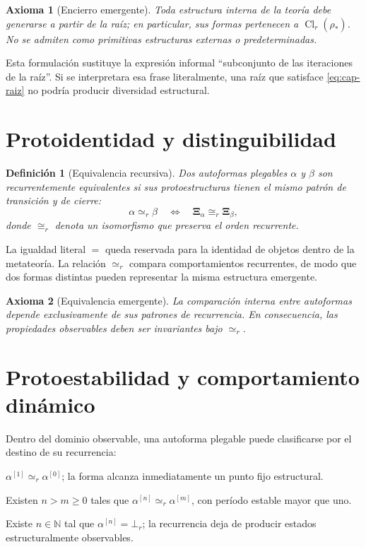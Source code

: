 \documentclass[11pt]{article}
\numberwithin{equation}{section}
\theoremstyle{prism}
\newtheorem{axiomacap}{Axioma}
\newtheorem{defcap}{Definición}
\newcommand{\N}{\mathbb{N}}
\newcommand{\raiz}{\rho_{\!*}}
\newcommand{\iter}[2]{#1^{[#2]}}
\newcommand{\peq}{\simeq_{\!r}}
\newcommand{\inestable}{\bot_{\!r}}
\newcommand{\Proto}[1]{\boldsymbol{\Xi}_{#1}}
\DeclareMathOperator{\Cl}{Cl}
\begin{document}
\begin{axiomacap}[Encierro emergente]
Toda estructura interna de la teoría debe generarse a partir de la raíz; en
particular, sus formas pertenecen a $\Cl_r(\raiz)$. No se admiten como primitivas
estructuras externas o predeterminadas.
\end{axiomacap}

Esta formulación sustituye la expresión informal ``subconjunto de las iteraciones
de la raíz''. Si se interpretara esa frase literalmente, una raíz que satisface
\eqref{eq:cap-raiz} no podría producir diversidad estructural.

\section{Protoidentidad y distinguibilidad}

\begin{defcap}[Equivalencia recursiva]
Dos autoformas plegables $\alpha$ y $\beta$ son recurrentemente equivalentes si
sus protoestructuras tienen el mismo patrón de transición y de cierre:
\begin{equation}
  \alpha\peq\beta
  \quad\Longleftrightarrow\quad
  \Proto{\alpha}\cong_r\Proto{\beta},
  \label{eq:igualdad-recursiva}
\end{equation}
donde $\cong_r$ denota un isomorfismo que preserva el orden recurrente.
\end{defcap}

La igualdad literal $=$ queda reservada para la identidad de objetos dentro de
la metateoría. La relación $\peq$ compara comportamientos recurrentes, de modo
que dos formas distintas pueden representar la misma estructura emergente.

\begin{axiomacap}[Equivalencia emergente]
La comparación interna entre autoformas depende exclusivamente de sus patrones
de recurrencia. En consecuencia, las propiedades observables deben ser
invariantes bajo $\peq$.
\end{axiomacap}

\section{Protoestabilidad y comportamiento dinámico}

Dentro del dominio observable, una autoforma plegable puede clasificarse por el
destino de su recurrencia:
\begin{description}[leftmargin=2.2em,style=nextline]
  \item[Estática.]
  $\iter{\alpha}{1}\peq\iter{\alpha}{0}$; la forma alcanza inmediatamente un
  punto fijo estructural.

  \item[Cíclica.]
  Existen $n>m\geq0$ tales que
  $\iter{\alpha}{n}\peq\iter{\alpha}{m}$, con período estable mayor que uno.

  \item[Degenerada.]
  Existe $n\in\N$ tal que $\iter{\alpha}{n}=\inestable$; la recurrencia deja de
  producir estados estructuralmente observables.
\end{description}
\end{document}
